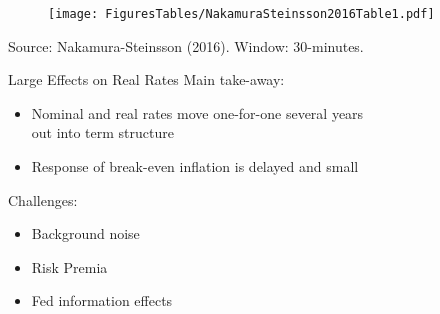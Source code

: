 \documentclass[11pt,aspectratio=169,xcolor={dvipsnames},hyperref={pdftex,pdfpagemode=UseNone,hidelinks,pdfdisplaydoctitle=true},usepdftitle=false]{beamer}
\begin{document}
\begin{frame}
\begin{figure}
\centering
\texttt{[image: FiguresTables/NakamuraSteinsson2016Table1.pdf]}
\end{figure}
\vspace{-6mm}
{\scriptsize Source: Nakamura-Steinsson (2016). Window: 30-minutes.}
\end{frame}


\begin{frame}{Large Effects on Real Rates}
Main take-away:
\begin{itemize}
	\item Nominal and real rates move one-for-one several years \\ out into term structure
	\item Response of break-even inflation is delayed and small 
\end{itemize}
\medskip 
Challenges:
\begin{itemize}
	\item Background noise
	\item Risk Premia
	\item Fed information effects
\end{itemize}
\end{frame}
\end{document}
